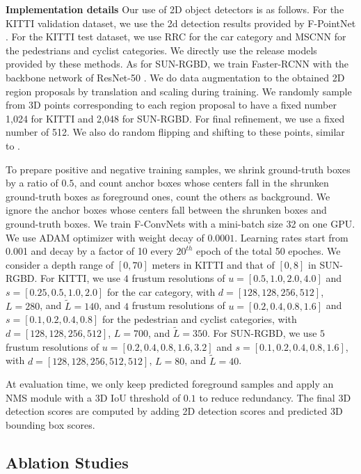 \documentclass[letterpaper, 10 pt, conference]{ieeeconf}
\begin{document}
\vspace{0.1cm}
\noindent\textbf{Implementation details} Our use of 2D object detectors is as follows. For the KITTI validation dataset, we use the 2d detection results provided by F-PointNet \cite{qi2018frustum}. For the KITTI test dataset, we use RRC \cite{ren2017accurate} for the car category and MSCNN \cite{cai2016unified} for the pedestrians and cyclist categories. We directly use the release models provided by these methods. As for SUN-RGBD, we train Faster-RCNN \cite{ren2015faster} with the backbone network of ResNet-50 \cite{he2016deep}. We do data augmentation to the obtained 2D region proposals by translation and scaling during training. We randomly sample from 3D points corresponding to each region proposal to have a fixed number 1,024 for KITTI and 2,048 for SUN-RGBD. For final refinement, we use a fixed number of 512. We also do random flipping and shifting to these points, similar to \cite{qi2018frustum}.

To prepare positive and negative training samples, we shrink ground-truth boxes by a ratio of $0.5$, and count anchor boxes whose centers fall in the shrunken ground-truth boxes as foreground ones, count the others as background. We ignore the anchor boxes whose centers fall between the shrunken boxes and ground-truth boxes.  We train F-ConvNets with a mini-batch size 32 on one GPU. We use ADAM optimizer with weight decay of  $0.0001$. Learning rates start from 0.001 and decay by a factor of 10 every $20^{th}$ epoch of the total 50 epoches. We consider a depth range of $[0, 70]$ meters in KITTI and that of $[0, 8]$ in SUN-RGBD. For KITTI, we use $4$ frustum resolutions of $u = [0.5, 1.0, 2.0, 4.0]$ and $s = [0.25, 0.5, 1.0, 2.0]$ for the car category, with $d=[128, 128, 256, 512]$, $L=280$, and $\tilde{L}=140$, and $4$ frustum resolutions of $u = [0.2, 0.4, 0.8, 1.6]$ and $s = [0.1, 0.2, 0.4, 0.8]$ for the pedestrian and cyclist categories, with $d=[128, 128, 256, 512]$, $L=700$, and $\tilde{L}=350$. For SUN-RGBD, we use $5$ frustum resolutions of $u = [0.2, 0.4, 0.8, 1.6, 3.2]$ and $s = [0.1, 0.2, 0.4, 0.8, 1.6]$, with $d=[128, 128, 256, 512, 512]$, $L=80$, and $\tilde{L}=40$.

At evaluation time, we only keep predicted foreground samples and apply an NMS module with a 3D IoU threshold of $0.1$ to reduce redundancy.
The final 3D detection scores are computed by adding 2D detection scores and predicted 3D bounding box scores.

\subsection{Ablation Studies}
\end{document}
